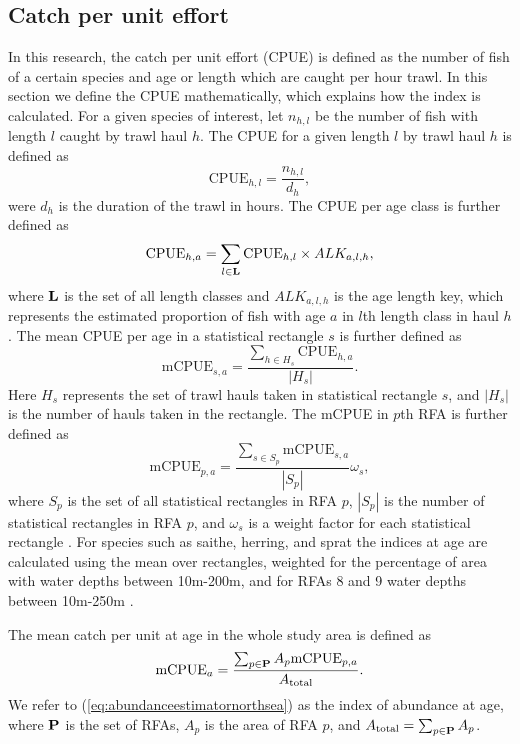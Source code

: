 \documentclass[a4paper 12pt]{article}
\numberwithin{equation}{section}
\begin{document}
\subsection{Catch per unit effort}
\label{sec:cpueestimators}
In this research, the catch per unit effort (CPUE) is defined as the number of fish of a certain species and age or length which are caught per hour trawl. In this section we define the CPUE mathematically, which explains how the index is calculated. For a given species of interest, let $n_{h,l}$ be the number of fish with length $l$ caught by trawl haul $h$. The CPUE for a given length $l$ by trawl haul $h$ is defined as 
\begin{equation}\label{eq:cpueHaul}
\mathrm{CPUE}_{h,l} =\frac{n_{h,l}}{d_h},
\end{equation}
were $d_h$ is the duration of the trawl in hours. The CPUE per age class is further defined as
\begin{equation}\label{eq:cpueALK}
\mathrm{CPUE}_{h,a} =\sum_{l \in {\bf L}}\mathrm{CPUE}_{h, l} \times ALK_{a,l,h},
\end{equation}
where ${\bf L}$ is the set of all length classes and $ALK_{a,l,h}$ is the age length key, which represents the estimated proportion of fish with age $a$ in $l$th length class in haul $h$. The mean CPUE per age in a statistical rectangle $s$ is further defined as
\begin{equation}\label{eq:cpueRec}
\mathrm{mCPUE}_{s,a} =\frac{\sum_{h \in H_{s}} \mathrm{CPUE}_{h,a}}{|H_{s}|}.
\end{equation}
Here $H_{s}$ represents the set of trawl hauls taken in statistical rectangle $s$, and $|H_{s}|$ is the number of hauls taken in the rectangle. The mCPUE in $p$th RFA is further defined as
\begin{equation}\label{eq:cpueRFA}
\mathrm{mCPUE}_{p,a} = \frac{ \sum_{s \in S_{p}} \mathrm{mCPUE}_{s,a}}{|S_{p}|} \omega_s,
\end{equation}
where $S_{p}$ is the set of all statistical rectangles in RFA $p$, $|S_{p}|$ is the number of statistical rectangles in RFA $p$, and $\omega_s$ is a weight factor for each statistical rectangle \citep{ICES2013}. For species such as saithe, herring, and sprat the indices at age are calculated using the mean over rectangles, weighted for the percentage of area with water depths between 10m-200m, and for RFAs 8 and 9 water depths between 10m-250m \citep{ICES2013}.

 The mean catch per unit at age in the whole study area is defined as
\begin{equation}
\text{mCPUE}_a= \frac{\sum_{p\in {\bf P}} A_{p}  \mathrm{mCPUE}_{p,a}}{A_{\text{total}}}.
\label{eq:abundanceestimatornorthsea}
\end{equation}
We refer to (\ref{eq:abundanceestimatornorthsea}) as the index of abundance at age, where ${\bf P}$ is the set of RFAs, $A_p$ is the area of RFA $p$, and $A_{\text{total}} = \sum_{p\in {\bf P}} A_{p}$.
\end{document}
